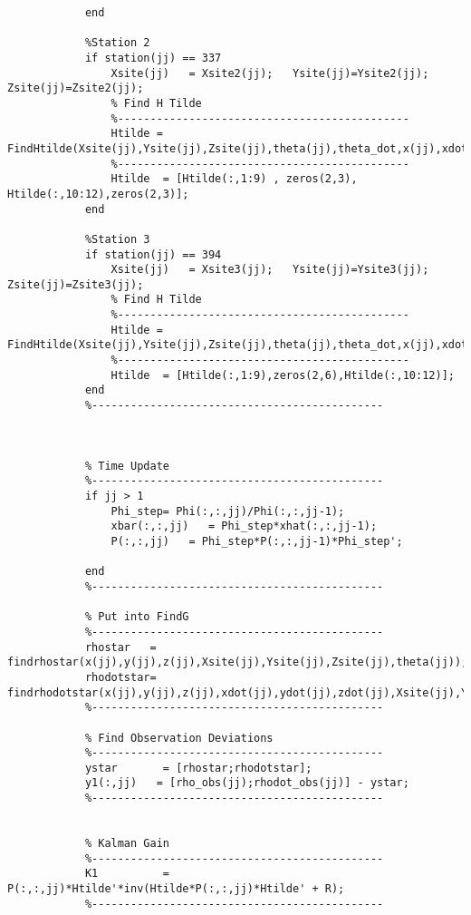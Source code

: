 \documentclass[12pt,a4paper,oneside]{article}
\numberwithin{equation}{section}   		%
\begin{document}
\begin{appendices}
\begin{lstlisting}
	        end
	
	        %Station 2
	        if station(jj) == 337
	            Xsite(jj)   = Xsite2(jj);   Ysite(jj)=Ysite2(jj);   Zsite(jj)=Zsite2(jj);
	            % Find H Tilde
	            %---------------------------------------------
	            Htilde = FindHtilde(Xsite(jj),Ysite(jj),Zsite(jj),theta(jj),theta_dot,x(jj),xdot(jj),y(jj),ydot(jj),z(jj),zdot(jj));
	            %---------------------------------------------
	            Htilde  = [Htilde(:,1:9) , zeros(2,3), Htilde(:,10:12),zeros(2,3)];
	        end
	
	        %Station 3
	        if station(jj) == 394
	            Xsite(jj)   = Xsite3(jj);   Ysite(jj)=Ysite3(jj);   Zsite(jj)=Zsite3(jj);
	            % Find H Tilde
	            %---------------------------------------------
	            Htilde = FindHtilde(Xsite(jj),Ysite(jj),Zsite(jj),theta(jj),theta_dot,x(jj),xdot(jj),y(jj),ydot(jj),z(jj),zdot(jj));
	            %---------------------------------------------
	            Htilde  = [Htilde(:,1:9),zeros(2,6),Htilde(:,10:12)];
	        end
	        %---------------------------------------------
	        
	        
	        
	        % Time Update
	        %---------------------------------------------
	        if jj > 1
	            Phi_step= Phi(:,:,jj)/Phi(:,:,jj-1);
	            xbar(:,:,jj)   = Phi_step*xhat(:,:,jj-1);
	            P(:,:,jj)   = Phi_step*P(:,:,jj-1)*Phi_step';
	            
	        end
	        %---------------------------------------------
	        
	        % Put into FindG
	        %---------------------------------------------
	        rhostar   = findrhostar(x(jj),y(jj),z(jj),Xsite(jj),Ysite(jj),Zsite(jj),theta(jj));
	        rhodotstar= findrhodotstar(x(jj),y(jj),z(jj),xdot(jj),ydot(jj),zdot(jj),Xsite(jj),Ysite(jj),Zsite(jj),theta(jj),theta_dot,rhostar);
	        %---------------------------------------------
	        
	        % Find Observation Deviations
	        %---------------------------------------------
	        ystar       = [rhostar;rhodotstar];
	        y1(:,jj)   = [rho_obs(jj);rhodot_obs(jj)] - ystar;
	        %---------------------------------------------
	        
	        
	        % Kalman Gain
	        %---------------------------------------------
	        K1          = P(:,:,jj)*Htilde'*inv(Htilde*P(:,:,jj)*Htilde' + R);
	        %---------------------------------------------
	        

\end{lstlisting}
\end{appendices}
\end{document}
